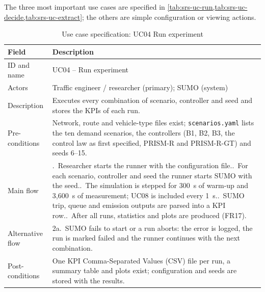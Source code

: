 The three most important use cases are specified in \cref{tab:srs-uc-run,tab:srs-uc-decide,tab:srs-uc-extract}; the others are simple configuration or viewing actions.

\begin{table}[htbp]
\centering
\caption{Use case specification: UC04 Run experiment}
\label{tab:srs-uc-run}
\small
\renewcommand{\arraystretch}{1.15}
\begin{tabularx}{\textwidth}{@{}>{\raggedright\arraybackslash}p{2.8cm}>{\raggedright\arraybackslash}X@{}}
\toprule
\textbf{Field} & \textbf{Description}\\
\midrule
ID and name & UC04 -- Run experiment\\
Actors & Traffic engineer / researcher (primary); SUMO (system)\\
Description & Executes every combination of scenario, controller and seed and stores the KPIs of each run.\\
Pre-conditions & Network, route and vehicle-type files exist; \texttt{scenarios.yaml} lists the ten demand scenarios, the controllers (B1, B2, B3, the control law as first specified, PRISM-R and PRISM-R-GT) and seeds 6--15.\\
Main flow & 1.~Researcher starts the runner with the configuration file.\newline
2.~For each scenario, controller and seed the runner starts SUMO with the seed.\newline
3.~The simulation is stepped for 300~s of warm-up and 3,600~s of measurement; UC08 is included every 1~s.\newline
4.~SUMO trip, queue and emission outputs are parsed into a KPI row.\newline
5.~After all runs, statistics and plots are produced (FR17).\\
Alternative flow & 2a.~SUMO fails to start or a run aborts: the error is logged, the run is marked failed and the runner continues with the next combination.\\
Post-conditions & One KPI Comma-Separated Values (CSV) file per run, a summary table and plots exist; configuration and seeds are stored with the results.\\
\bottomrule
\end{tabularx}
\end{table}

